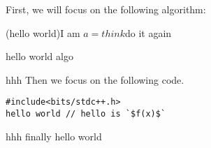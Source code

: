 


\def\HWTITLE{Homework 2}
\def\COURSECODE{CS 225}
\def\AUTHOR{Group D1}



\makeMyTitle
\thispagestyle{firstPage}

\begin{questions}
    \question
    First, we will focus on the following algorithm:
    \begin{algorithm}
        \While(hello world){I am $a = think$}{do it again}
        \caption{hello world algo}
    \end{algorithm}

    \newpage hhh
    \question Then we focus on the following code.
    \begin{lstlisting}
#include<bits/stdc++.h>
hello world // hello is `$f(x)$`
    \end{lstlisting}

    \newpage hhh
    \question finally hello world

\end{questions}



